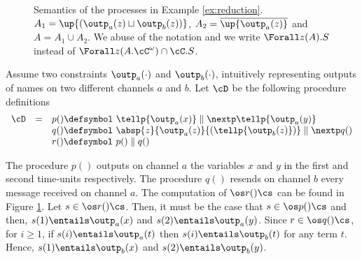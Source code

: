 \documentclass{tlp}
\begin{document}
\begin{figure}
\caption{Semantics of  the processes   in Example \ref{ex:reduction}.  
 $A_1=\up{(\outp_a(z)\sqcup \outp_b(z))}$, $A_2=\overline{\up{\outp_a(z)}}$ and $A=A_1 \cup A_2$. We abuse of the notation and we 
write $\Forall z(A).S$ instead of $\Forall z(A.\cC^\omega) \cap \cC.S$.
\label{fig:comp-example-den-sem}}
\end{figure}
\begin{example}\label{ex:reduction}
Assume two constraints $\outp_a(\cdot)$ and $\outp_b(\cdot)$, intuitively representing  outputs of names on two different channels $a$ and $b$. Let $\cD$ be the following procedure definitions
 \[
 \begin{array}{lll}
 \cD & = & p() \defsymbol\  \tellp{\outp_a(x)}  \parallel \nextp \tellp{\outp_a(y)}  \\
        &    & q() \defsymbol\  \absp{z}{\outp_a(z)}{(\tellp{\outp_b(z)})} \parallel \nextp q()\\
        &    & r() \defsymbol\  p() \parallel q()
 \end{array}
 \]
 
The procedure  $p()$ outputs on channel $a$ the variables $x$ and $y$ in the first and second time-units respectively. The procedure  $q()$ resends on channel $b$ every message received on channel $a$. 
The computation of $\os r()\cs$ can be found in Figure \ref{fig:comp-example-den-sem}. 
  Let $s \in \os r()\cs$. 
  Then, it must be the case that $s\in \os p()\cs$ and then,  $s(1) \entails \outp_a(x)$ and $s(2) \entails \outp_a(y)$. Since $r\in \os q()\cs$, 
  for $i\geq1$, if $s(i) \entails \outp_a(t)$ then $s(i) \entails \outp_b(t)$ for any term $t$. Hence, $s(1) \entails \outp_b(x)$ and $s(2) \entails \outp_b(y)$. 
\end{example}
\end{document}
